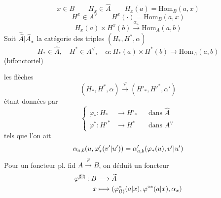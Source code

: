 \[
x\in B\qquad H_x\in\widehat A\qquad H_x(a)=\mathrm{Hom}_B(a,x)
\]
\[
H^x\in A^\vee\qquad H^x(\cdot)=\mathrm{Hom}_B(a,x)
\]
\[
H_x(a)\times H^x(b)\xrightarrow{\alpha_x}\mathrm{Hom}_A(a,b)
\]
Soit ${\widetilde{\widetilde A}|\widetilde A}_{{{*}}}$ la catégorie des triples $(H_*,H^*,\alpha)$
\[
H_*\in\widehat A,\quad H^*\in A^\vee,\quad
\alpha:H_*(a)\times H^*(b)\longrightarrow\mathrm{Hom}_A(a,b)
\]
(bifonctoriel)

les flèches
\[
(H_*,H^*,\alpha)\xrightarrow{\varphi}(H'_*,H'^*,\alpha')
\]
étant données par
\[
\left\{\begin{aligned}
\varphi_*:H_*&\longrightarrow H'_*&&\text{dans }\widehat A\\
\varphi^*:H'^*&\longrightarrow H^*&&\text{dans }A^\vee
\end{aligned}\right.
\]
tels que  l'on ait
\[
\alpha_{a,b}(u,\varphi'_*({v'|u'}))=\alpha'_{a,b}(\varphi_*(u),{v'|u'})
\]
Pour un foncteur pl. fid \(A\xrightarrow{\varphi}B\), on déduit un foncteur
\[
\begin{aligned}
\varphi^{{\sharp|\natural}}:B&\longrightarrow\widetilde A\\
x&\longmapsto(\varphi^*_{{(!)}}({a|x}),\varphi^{\circ *}({a|x}),\alpha_x)
\end{aligned}
\]

